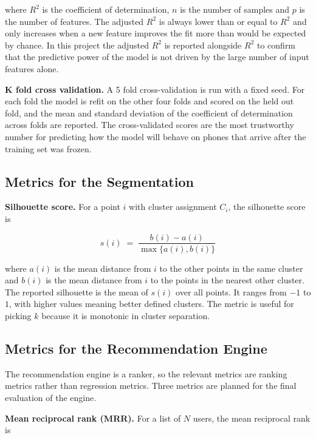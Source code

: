 \documentclass[12pt]{report}
\numberwithin{figure}{chapter}
\numberwithin{table}{chapter}
\numberwithin{equation}{chapter}
\begin{document}
\noindent where $R^{2}$ is the coefficient of determination, $n$ is the number of samples and $p$ is the number of features. The adjusted $R^{2}$ is always lower than or equal to $R^{2}$ and only increases when a new feature improves the fit more than would be expected by chance. In this project the adjusted $R^{2}$ is reported alongside $R^{2}$ to confirm that the predictive power of the model is not driven by the large number of input features alone.

\textbf{K fold cross validation.} A 5 fold cross-validation is run with a fixed seed. For each fold the model is refit on the other four folds and scored on the held out fold, and the mean and standard deviation of the coefficient of determination across folds are reported. The cross-validated scores are the most trustworthy number for predicting how the model will behave on phones that arrive after the training set was frozen.

\subsection{Metrics for the Segmentation}

\textbf{Silhouette score.} For a point $i$ with cluster assignment $C_i$, the silhouette score is

\begin{equation}
s(i) \;=\; \frac{b(i) - a(i)}{\max\{ a(i), b(i) \}}
\label{eq:silhouette}
\end{equation}

\noindent where $a(i)$ is the mean distance from $i$ to the other points in the same cluster and $b(i)$ is the mean distance from $i$ to the points in the nearest other cluster. The reported silhouette is the mean of $s(i)$ over all points. It ranges from $-1$ to $1$, with higher values meaning better defined clusters. The metric is useful for picking $k$ because it is monotonic in cluster separation.

\subsection{Metrics for the Recommendation Engine}

The recommendation engine is a ranker, so the relevant metrics are ranking metrics rather than regression metrics. Three metrics are planned for the final evaluation of the engine.

\textbf{Mean reciprocal rank (MRR).} For a list of $N$ users, the mean reciprocal rank is
\end{document}
